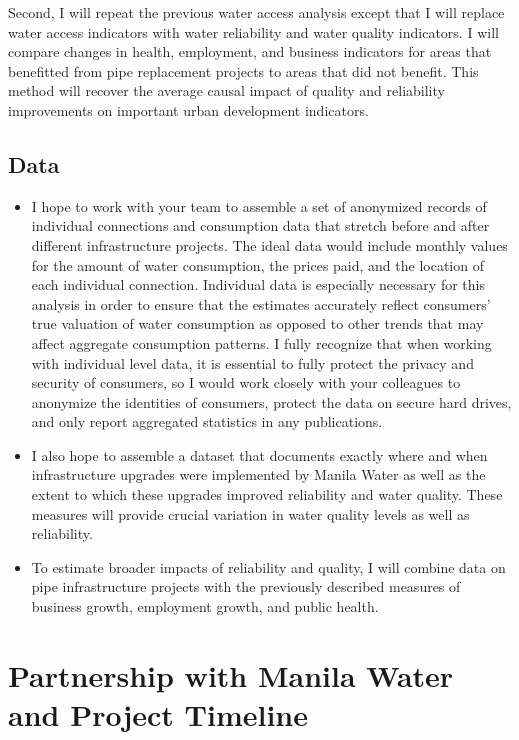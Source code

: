 \documentclass{article}
\begin{document}
Second, I will repeat the previous water access analysis except that I will replace water access indicators with water reliability and water quality indicators.  I will compare changes in health, employment, and business indicators for areas that benefitted from pipe replacement projects to areas that did not benefit.  This method will recover the average causal impact of quality and reliability improvements on important urban development indicators.

\subsection*{Data}

\begin{itemize}
\item I hope to work with your team to assemble a set of anonymized records of individual connections and consumption data that stretch before and after different infrastructure projects.  The ideal data would include monthly values for the amount of water consumption, the prices paid, and the location of each individual connection.  Individual data is especially necessary for this analysis in order to ensure that the estimates accurately reflect consumers' true valuation of water consumption as opposed to other trends that may affect aggregate consumption patterns.  I fully recognize that when working with individual level data, it is essential to fully protect the privacy and security of consumers, so I would work closely with your colleagues to anonymize the identities of consumers, protect the data on secure hard drives, and only report aggregated statistics in any publications.
\item I also hope to assemble a dataset that documents exactly where and when infrastructure upgrades were implemented by Manila Water as well as the extent to which these upgrades improved reliability and water quality.  These measures will provide crucial variation in water quality levels as well as reliability.
\item To estimate broader impacts of reliability and quality, I will combine data on pipe infrastructure projects with the previously described measures of business growth, employment growth, and public health.
\end{itemize}

\section*{Partnership with Manila Water and Project Timeline}
\end{document}
